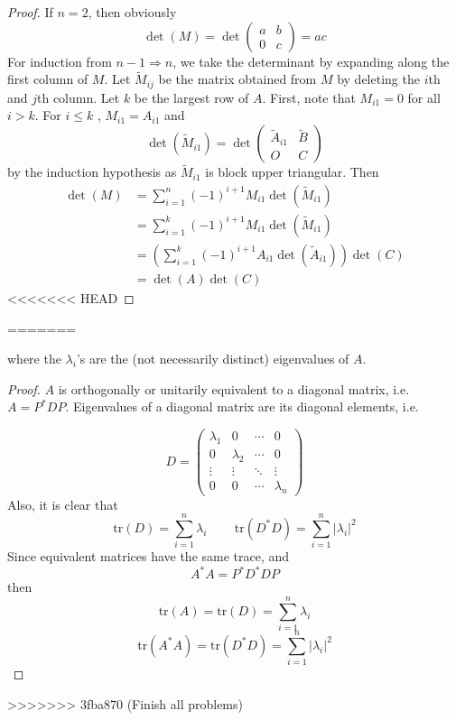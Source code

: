 \begin{homeworkProblem}

\solution

\begin{proof}
If $n = 2$, then obviously \[
\det(M) = \det\begin{pmatrix}
    a & b \\
    0 & c
\end{pmatrix} = ac
\]
For induction from $n-1 \Rightarrow n$, we take the determinant by expanding along the first column of $M$. Let $\tilde{M}_{ij}$ be the matrix obtained from $M$ by deleting the $i$th and $j$th column. Let $k$ be the largest row of $A$. First, note that $M_{i1} = 0$ for all $i > k$. For $i \leq k$ , $M_{i1} = A_{i1}$ and \[
    \det(\tilde{M}_{i1}) = \det\begin{pmatrix}
        \tilde{A}_{i1} & \tilde{B} \\
        O & C
    \end{pmatrix}
\]
by the induction hypothesis as $\tilde{M}_{i1}$ is block upper triangular. Then
\[
    \begin{aligned}
        \det(M) &= \sum_{i=1}^{n}(-1)^{i+1}M_{i1}\det(\tilde{M}_{i1}) \\
        &= \sum_{i=1}^{k}(-1)^{i+1}M_{i1}\det(\tilde{M}_{i1}) \\
        &= \left(\sum_{i=1}^{k}(-1)^{i+1}A_{i1}\det(\tilde{A}_{i1})\right)\det(C)\\
        &= \det(A)\det(C)
    \end{aligned}
\]
<<<<<<< HEAD
\end{proof}
=======

where the $\lambda_i$'s are the (not necessarily distinct) eigenvalues of $A$.

\solution

\begin{proof}
$A$ is orthogonally or unitarily equivalent to a diagonal matrix, i.e. $A = P^*DP$. Eigenvalues of a diagonal matrix are its diagonal elements, i.e.

\[
D = \begin{pmatrix}
    \lambda_1 & 0 & \cdots & 0\\
    0 & \lambda_2 & \cdots & 0 \\
    \vdots & \vdots & \ddots & \vdots \\
    0 & 0 & \cdots & \lambda_n
\end{pmatrix}
\]
Also, it is clear that \[
\mathrm{tr}(D) = \sum_{i=1}^n \lambda_i \quad \, \quad
\mathrm{tr}(D^*D) = \sum_{i=1}^n |\lambda_i|^2
\]
Since equivalent matrices have the same trace, and \[
A^*A = P^*D^*DP
\]
then \[
\mathrm{tr}(A) = \mathrm{tr}(D) = \sum_{i=1}^n \lambda_i
\]
\[
\mathrm{tr}(A^*A) = \mathrm{tr}(D^*D) = \sum_{i=1}^n |\lambda_i|^2
\]
\end{proof}

>>>>>>> 3fba870 (Finish all problems)
\end{homeworkProblem}
